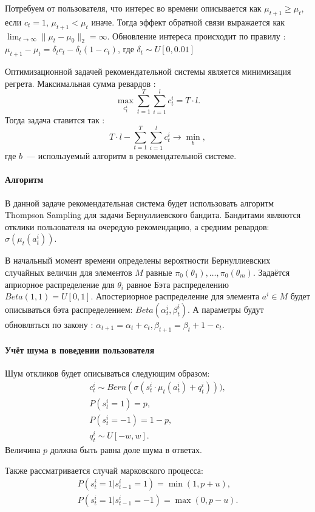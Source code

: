 \documentclass[12pt, twoside]{article}
\begin{document}
Потребуем от пользователя, что интерес во времени описывается как $\mu_{t+1} \geq \mu_{t}$, если $c_t = 1$,  $\mu_{t+1} < \mu_{t}$ иначе. 
Тогда эффект обратной связи выражается как $\lim_{t \to \infty} \|\mu_t - \mu_0 \|_2 = \infty$.
Обновление интереса происходит по правилу : 
$\mu_{t+1} - \mu_{t} = \delta_t c_t - \delta_t (1 - c_t)$, 
где $\delta_t \sim U[0, 0.01]$

Оптимизационной задачей рекомендательной системы является минимизация регрета. 
Максимальная сумма ревардов : \[ \max_{c_t^i} \sum_{t = 1}^T \sum_{i = 1}^l c_t^i = T \cdot l.\] 
Тогда задача ставится так : 
\[
  T \cdot l - \sum_{t = 1}^T \sum_{i = 1}^l c_t^i \to \min_{b}, 
\]
где $b$~--- используемый алгоритм в рекомендательной системе. 

\paragraph{Алгоритм}
В данной задаче рекомендательная система будет использовать алгоритм Thompson Sampling для задачи Бернуллиевского бандита.  
Бандитами являются отклики пользователя на очередую рекомендацию, а средним ревардов: $\sigma(\mu_t(a_t^i))$.

В начальный момент времени определены вероятности Бернуллиевских случайных величин для элементов $M$ равные $\pi_0(\theta_1), \dots, \pi_0(\theta_m)$. 
Задаётся априорное распределение для $\theta_i$ равное Бэта распределению $Beta(1, 1) = U[0, 1]$. 
Апостериорное распределение для элемента $a^i \in M$ будет описываться бэта распределением: $Beta(\alpha_t^i, \beta_t^i)$. 
А параметры будут обновляться по закону :
$\alpha_{t+1} = \alpha_t + c_t, \beta_{t+1} = \beta_t + 1 - c_t$.

\paragraph{Учёт шума в поведении пользователя}
Шум откликов будет описываться следующим образом: 
\begin{gather*}
  c_t^i \sim Bern (\sigma(s_t^i \cdot \mu_t(a_t^i) + q_t^i))), \\
  P(s_t^i = 1) = p, \\ P(s_t^i = -1) = 1 - p, \\
  q_t^i \sim U[-w, w].
\end{gather*}
Величина $p$ должна быть равна доле шума в ответах. 

Также рассматривается случай марковского процесса: 
\begin{gather*}
  P(s_t^i = 1 | s_{t-1}^i = 1) = \min(1, p + u), \\ 
  P(s_t^i = 1 | s_{t-1}^i = -1) = \max(0, p - u). 
\end{gather*}
\end{document}
